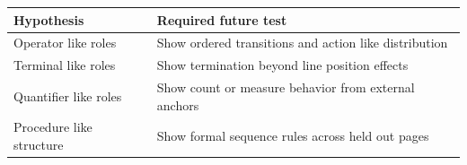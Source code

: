 {\small
\begin{tabular}{ll}
\toprule
Hypothesis & Required future test \\
\midrule
Operator like roles & Show ordered transitions and action like distribution \\
Terminal like roles & Show termination beyond line position effects \\
Quantifier like roles & Show count or measure behavior from external anchors \\
Procedure like structure & Show formal sequence rules across held out pages \\
\bottomrule
\end{tabular}
}
